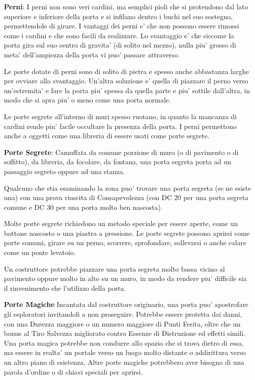 \documentclass[a4paper,11pt,twoside,openany]{book}
\begin{document}
{\textbf{Perni}: I perni non sono veri cardini, ma semplici pioli che si protendono dal lato superiore e inferiore della porta e si infilano dentro i buchi nel suo sostegno, permettendole di girare. I vantaggi dei perni e' che non possono essere rimossi come i cardini e che sono facili da realizzare. Lo svantaggio e' che siccome la porta gira sul suo centro di gravita' (di solito nel mezzo), nulla piu' grosso di meta' dell'ampiezza della porta vi puo' passare attraverso.

Le porte dotate di perni sono di solito di pietra e spesso anche abbastanza larghe per ovviare allo svantaggio. Un'altra soluzione e' quella di piazzare il perno verso un'estremita' e fare la porta piu' spessa da quella parte e piu' sottile dall'altra, in modo che si apra piu' o meno come una porta normale.

Le porte segrete all'interno di muri spesso ruotano, in quanto la mancanza di cardini rende piu' facile occultare la presenza della porta. I perni permettono anche a oggetti come una libreria di essere usati come porte segrete.

\textbf{Porte Segrete}: Camuffata da comune porzione di muro (o di pavimento o di soffitto), da libreria, da focolare, da fontana, una porta segreta porta ad un passaggio segreto oppure ad una stanza.

Qualcuno che stia esaminando la zona puo' trovare una porta segreta (se ne esiste una) con una prova riuscita di Consapevolezza (con DC 20 per una porta segreta comune e DC 30 per una porta molto ben nascosta).

Molte porte segrete richiedono un metodo speciale per essere aperte, come un bottone nascosto o una piastra a pressione. Le porte segrete possono aprirsi come porte comuni, girare su un perno, scorrere, sprofondare, sollevarsi o anche calare come un ponte levatoio.

Un costruttore potrebbe piazzare una porta segreta molto bassa vicino al pavimento oppure molto in alto su un muro, in modo da rendere piu' difficile sia il rinvenimento che l'utilizzo della porta.

\textbf{Porte Magiche} Incantata dal costruttore originario, una porta puo' apostrofare gli esploratori invitandoli a non proseguire. Potrebbe essere protetta dai danni, con una Durezza maggiore o un numero maggiore di Punti Ferita, oltre che un bonus al Tiro Salvezza migliorato contro Essenze di Distruzione ed effetti simili. Una porta magica potrebbe non condurre allo spazio che si trova dietro di essa, ma essere in realta' un portale verso un luogo molto distante o addirittura verso un altro piano di esistenza. Altre porte magiche potrebbero aver bisogno di una parola d'ordine o di chiavi speciali per aprirsi.

}
\end{document}
